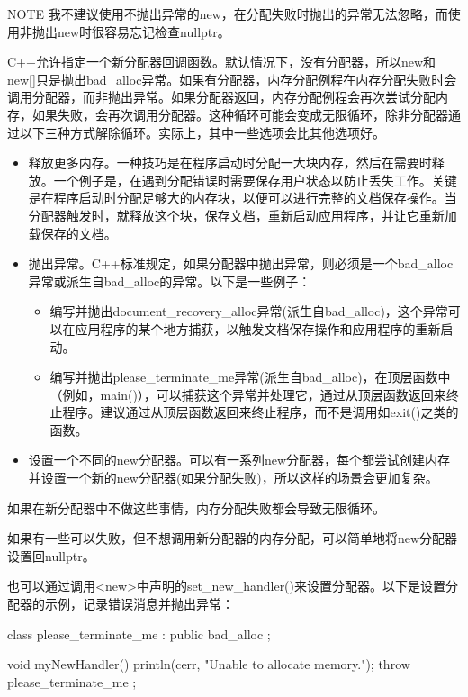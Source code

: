 \begin{myNotic}{NOTE}
我不建议使用不抛出异常的new，在分配失败时抛出的异常无法忽略，而使用非抛出new时很容易忘记检查nullptr。
\end{myNotic}


C++允许指定一个新分配器回调函数。默认情况下，没有分配器，所以new和new[]只是抛出bad\_alloc异常。如果有分配器，内存分配例程在内存分配失败时会调用分配器，而非抛出异常。如果分配器返回，内存分配例程会再次尝试分配内存，如果失败，会再次调用分配器。这种循环可能会变成无限循环，除非分配器通过以下三种方式解除循环。实际上，其中一些选项会比其他选项好。

\begin{itemize}
\item
释放更多内存。一种技巧是在程序启动时分配一大块内存，然后在需要时释放。一个例子是，在遇到分配错误时需要保存用户状态以防止丢失工作。关键是在程序启动时分配足够大的内存块，以便可以进行完整的文档保存操作。当分配器触发时，就释放这个块，保存文档，重新启动应用程序，并让它重新加载保存的文档。

\item
抛出异常。C++标准规定，如果分配器中抛出异常，则必须是一个bad\_alloc异常或派生自bad\_alloc的异常。以下是一些例子：
\begin{itemize}
\item
编写并抛出document\_recovery\_alloc异常(派生自bad\_alloc)，这个异常可以在应用程序的某个地方捕获，以触发文档保存操作和应用程序的重新启动。

\item
编写并抛出please\_terminate\_me异常(派生自bad\_alloc)，在顶层函数中（例如，main()），可以捕获这个异常并处理它，通过从顶层函数返回来终止程序。建议通过从顶层函数返回来终止程序，而不是调用如exit()之类的函数。
\end{itemize}

\item
设置一个不同的new分配器。可以有一系列new分配器，每个都尝试创建内存并设置一个新的new分配器(如果分配失败)，所以这样的场景会更加复杂。
\end{itemize}

如果在新分配器中不做这些事情，内存分配失败都会导致无限循环。

如果有一些可以失败，但不想调用新分配器的内存分配，可以简单地将new分配器设置回nullptr。

也可以通过调用<new>中声明的set\_new\_handler()来设置分配器。以下是设置分配器的示例，记录错误消息并抛出异常：

\begin{cpp}
class please_terminate_me : public bad_alloc { };

void myNewHandler()
{
    println(cerr, "Unable to allocate memory.");
    throw please_terminate_me {};
}
\end{cpp}

